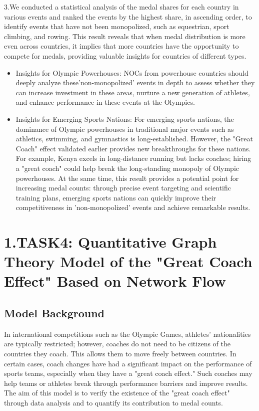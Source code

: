\documentclass{mcmthesis}
\begin{document}
    3.We conducted a statistical analysis of the medal shares for each country in various events and ranked the events by the highest share, in ascending order, to identify events that have not been monopolized, such as equestrian, sport climbing, and rowing. This result reveals that when medal distribution is more even across countries, it implies that more countries have the opportunity to compete for medals, providing valuable insights for countries of different types.

\begin{itemize}   
    \item Insights for Olympic Powerhouses: NOCs from powerhouse countries should deeply analyze these'non-monopolized' events in depth to assess whether they can increase investment in these areas, nurture a new generation of athletes, and enhance performance in these events at the Olympics.
    \item Insights for Emerging Sports Nations: For emerging sports nations, the dominance of Olympic powerhouses in traditional major events such as athletics, swimming, and gymnastics is long-established. However, the "Great Coach" effect validated earlier provides new breakthroughs for these nations. For example, Kenya excels in long-distance running but lacks coaches; hiring a "great coach" could help break the long-standing monopoly of Olympic powerhouses. At the same time, this result provides a potential point for increasing medal counts: through precise event targeting and scientific training plans, emerging sports nations can quickly improve their competitiveness in 'non-monopolized' events and achieve remarkable results.
\end{itemize} 

\section{1.TASK4: Quantitative Graph Theory Model of the "Great Coach Effect" Based on Network Flow}

\subsection{Model Background}

    In international competitions such as the Olympic Games, athletes' nationalities are typically restricted; however, coaches do not need to be citizens of the countries they coach. This allows them to move freely between countries. In certain cases, coach changes have had a significant impact on the performance of sports teams, especially when they have a "great coach effect." Such coaches may help teams or athletes break through performance barriers and improve results. The aim of this model is to verify the existence of the "great coach effect" through data analysis and to quantify its contribution to medal counts.
\end{document}

